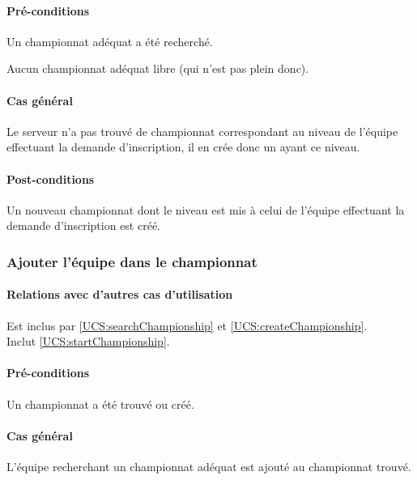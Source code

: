 \paragraph{Pré-conditions}
\begin{list}{}{\leftmargin=1.5em}
\item{Un championnat adéquat a été recherché.}
\item{Aucun championnat adéquat libre (qui n'est pas plein donc). }
\end{list}
\paragraph{Cas général}
Le serveur n'a pas trouvé de championnat correspondant au niveau de l'équipe effectuant la demande d'inscription, il en crée donc un ayant ce niveau.
\paragraph{Post-conditions}
\begin{list}{}{\leftmargin=1.5em}
\item{Un nouveau championnat dont le niveau est mis à celui de l'équipe effectuant la demande d'inscription est créé.}
\end{list}

\subsubsection{Ajouter l'équipe dans le championnat}
\label{UCS:addTeam}
\paragraph{Relations avec d'autres cas d'utilisation}
Est inclus par \ref{UCS:searchChampionship} et \ref{UCS:createChampionship}.\\
Inclut \ref{UCS:startChampionship}.
\paragraph{Pré-conditions}
\begin{list}{}{\leftmargin=1.5em}
\item{Un championnat a été trouvé ou créé.}
\end{list}
\paragraph{Cas général}
L'équipe recherchant un championnat adéquat est ajouté au championnat trouvé. 
